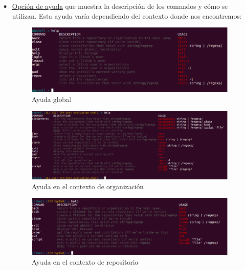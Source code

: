 \begin{itemize}
	\item \underline{Opción de ayuda} que muestra la descripción de los comandos y cómo se utilizan. Esta ayuda varía dependiendo del contexto donde nos encontremos:
	
		\begin{figure}[H]
		\begin{center}
		\includegraphics[width=1\textwidth]{images/help1-1}
		\caption{Ayuda global}
		\label{fig:help1-1}
		\end{center}
		\end{figure}
		
		\begin{figure}[H]
		\begin{center}
		\includegraphics[width=1\textwidth]{images/help1-2}
		\caption{Ayuda en el contexto de organización}
		\label{fig:help1-2}
		\end{center}
		\end{figure}
		
		\begin{figure}[H]
		\begin{center}
		\includegraphics[width=1\textwidth]{images/help1-3}
		\caption{Ayuda en el contexto de repositorio}
		\label{fig:help1-3}
		\end{center}
		\end{figure}
	

\end{itemize}
